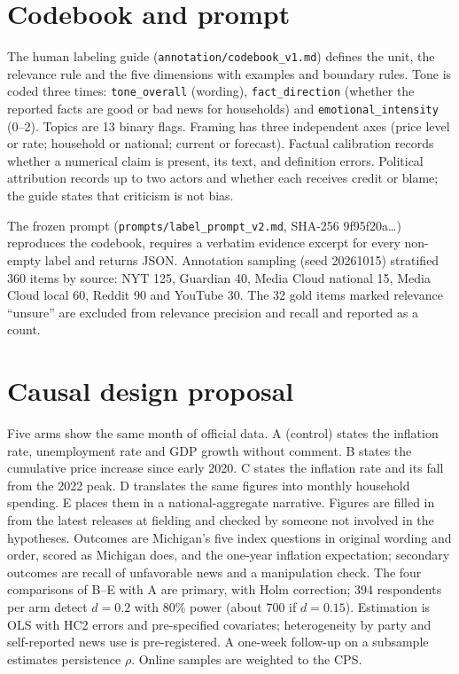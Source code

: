 \documentclass[11pt]{article}
\begin{document}
\section{Codebook and prompt}\label{app:codebook}

The human labeling guide (\texttt{annotation/codebook\_v1.md}) defines the unit, the relevance rule and the five dimensions with examples and boundary rules. Tone is coded three times: \texttt{tone\_overall} (wording), \texttt{fact\_direction} (whether the reported facts are good or bad news for households) and \texttt{emotional\_intensity} (0–2). Topics are 13 binary flags. Framing has three independent axes (price level or rate; household or national; current or forecast). Factual calibration records whether a numerical claim is present, its text, and definition errors. Political attribution records up to two actors and whether each receives credit or blame; the guide states that criticism is not bias.

The frozen prompt (\texttt{prompts/label\_prompt\_v2.md}, SHA-256 9f95f20a…) reproduces the codebook, requires a verbatim evidence excerpt for every non-empty label and returns JSON. Annotation sampling (seed 20261015) stratified 360 items by source: NYT 125, Guardian 40, Media Cloud national 15, Media Cloud local 60, Reddit 90 and YouTube 30. The 32 gold items marked relevance ``unsure'' are excluded from relevance precision and recall and reported as a count.

\section{Causal design proposal}\label{app:causal}

 Five arms show the same month of official data. A (control) states the inflation rate, unemployment rate and GDP growth without comment. B states the cumulative price increase since early 2020. C states the inflation rate and its fall from the 2022 peak. D translates the same figures into monthly household spending. E places them in a national-aggregate narrative. Figures are filled in from the latest releases at fielding and checked by someone not involved in the hypotheses. Outcomes are Michigan's five index questions in original wording and order, scored as Michigan does, and the one-year inflation expectation; secondary outcomes are recall of unfavorable news and a manipulation check. The four comparisons of B–E with A are primary, with Holm correction; 394 respondents per arm detect $d = 0.2$ with 80\% power (about 700 if $d = 0.15$). Estimation is OLS with HC2 errors and pre-specified covariates; heterogeneity by party and self-reported news use is pre-registered. A one-week follow-up on a subsample estimates persistence $\rho$. Online samples are weighted to the CPS.
\end{document}
